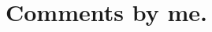\documentclass[
10pt, %
a4paper, %
twocolumn, %
landscape %
]{article}
\begin{document}
\section*{Comments by me.}



\end{document}
